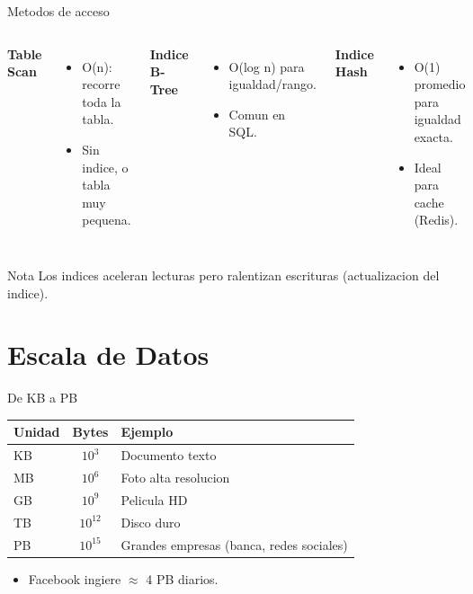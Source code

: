 \documentclass[aspectratio=169, 10pt, xcolor=table]{beamer}
\begin{document}
\begin{frame}{Metodos de acceso}
    \begin{columns}[t]
        \textbf{Table Scan}
        \begin{itemize}
            \item O(n): recorre toda la tabla.
            \item Sin indice, o tabla muy pequena.
        \end{itemize}
        \textbf{Indice B-Tree}
        \begin{itemize}
            \item O(log n) para igualdad/rango.
            \item Comun en SQL.
        \end{itemize}
        \textbf{Indice Hash}
        \begin{itemize}
            \item O(1) promedio para igualdad exacta.
            \item Ideal para cache (Redis).
        \end{itemize}
    \end{columns}
    \vspace{0.3cm}
    \begin{alertblock}{Nota}
        Los indices aceleran lecturas pero ralentizan escrituras (actualizacion del indice).
    \end{alertblock}
\end{frame}

\section{Escala de Datos}

\begin{frame}{De KB a PB}
    \begin{table}
        \centering
        \begin{tabular}{l|c|l}
            \toprule
            Unidad & Bytes & Ejemplo \\
            \midrule
            KB & $10^3$ & Documento texto \\
            MB & $10^6$ & Foto alta resolucion \\
            GB & $10^9$ & Pelicula HD \\
            TB & $10^{12}$ & Disco duro \\
            PB & $10^{15}$ & Grandes empresas (banca, redes sociales) \\
            \bottomrule
        \end{tabular}
    \end{table}
    \begin{itemize}
        \item Facebook ingiere $\approx$ 4 PB diarios.
    \end{itemize}
\end{frame}
\end{document}
